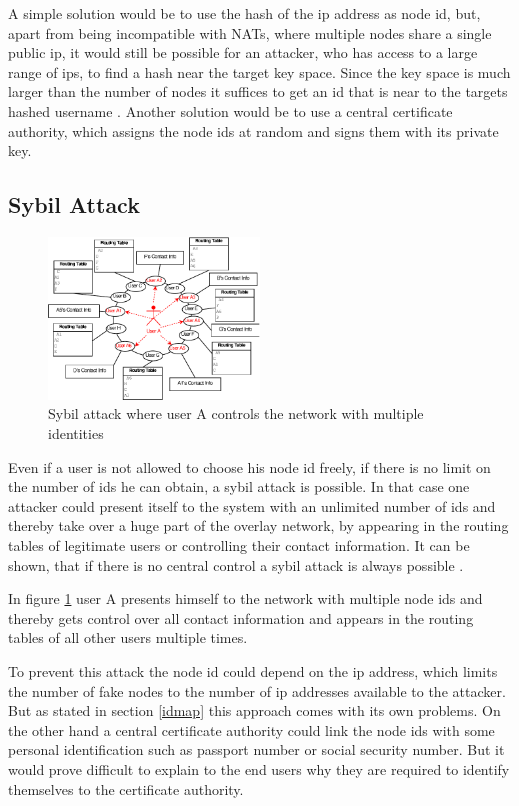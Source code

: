 \documentclass[a4paper,conference]{IEEEtran}
\begin{document}
A simple solution would be to use the hash of the ip address as node id, but,
apart from being incompatible with NATs, where multiple nodes share a single
public ip,
it would still be possible for an attacker, who has access to a large range of
ips, to find a hash near the target key space. Since the key space
is much larger than the number of nodes it suffices to get an id that is near to
the targets hashed username \cite{touceda}.
Another solution would be to use a central certificate authority, which assigns
the node ids at random and signs them with its private key.


\subsection{Sybil Attack}
\label{sybil}
\begin{figure}
\centering
\includegraphics[width=0.5\textwidth]{sybil}

\caption{Sybil attack where user A controls the network with multiple identities
\cite{touceda}}
\label{fig:sybil}
\end{figure}
Even if a user is not allowed to choose his node id freely, if there is no limit
on the number of ids he can obtain, a sybil attack is possible.
In that case one attacker could present itself to the system with an unlimited
number of ids and thereby take over a huge part of the overlay network, by
appearing in the routing tables of legitimate users or controlling their contact
information.
It can be shown, that if there is no central control a sybil attack is always
possible \cite{douceur, touceda}.

In figure \ref{fig:sybil} user A presents himself to the network with multiple
node ids and thereby gets control over all contact information and appears in
the routing tables of all other users multiple times.

To prevent this attack the node id could depend on the ip address, which limits
the number of fake nodes to the number of ip addresses available to the
attacker. But
as stated in section \ref{idmap} this approach comes with its own problems. On
the other hand a central certificate authority could link the
node ids with some personal identification such as passport number or social
security number. But it would prove difficult to explain to the end users
why they are required to identify themselves to the certificate authority.
\end{document}

